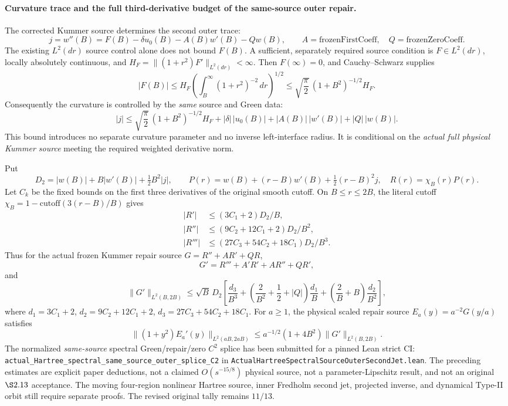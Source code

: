 \documentclass[11pt]{amsart}
\begin{document}
\paragraph{Curvature trace and the full third-derivative budget of the same-source outer repair.}
The corrected Kummer source determines the second outer trace:
\[
 j=w''(B)
 =F(B)-\delta u_0(B)
 -A(B)w'(B)-Qw(B),\qquad
 A=\mathrm{frozenFirstCoeff},\quad Q=\mathrm{frozenZeroCoeff}.
\]
The existing \(L^2(dr)\) source control alone does not bound \(F(B)\).
A sufficient, separately required source condition is
\(F\in L^2(dr)\), locally absolutely continuous, and
\(H_F=\|(1+r^2)F'\|_{L^2(dr)}<\infty\).
Then \(F(\infty)=0\), and Cauchy--Schwarz supplies
\[
 |F(B)|\le H_F\left(\int_B^\infty(1+r^2)^{-2}\,dr\right)^{1/2}
 \le \sqrt{\frac\pi2}\,(1+B^2)^{-1/2}H_F.
\]
Consequently the curvature is controlled by the \emph{same}
source and Green data:
\[
 |j|\le \sqrt{\frac\pi2}\,(1+B^2)^{-1/2}H_F
   +|\delta|\,|u_0(B)|+|A(B)|\,|w'(B)|+|Q|\,|w(B)|.
\]
This bound introduces no separate curvature parameter and no
inverse left-interface radius. It is conditional on the
\emph{actual full physical Kummer source} meeting the
required weighted derivative norm.

Put
\[
 D_2=|w(B)|+B|w'(B)|+\tfrac12B^2|j|,\qquad
 P(r)=w(B)+(r-B)w'(B)+\tfrac12(r-B)^2j,
 \quad R(r)=\chi_B(r)P(r).
\]
Let \(C_k\) be the fixed bounds on the first three
derivatives of the original smooth cutoff.
On \(B\le r\le2B\), the literal cutoff
\(\chi_B=1-\mathrm{cutoff}(3(r-B)/B)\) gives
\[
 \begin{aligned}
 |R'|&\le(3C_1+2)D_2/B,\\
 |R''|&\le(9C_2+12C_1+2)D_2/B^2,\\
 |R'''|&\le(27C_3+54C_2+18C_1)D_2/B^3.
 \end{aligned}
\]
Thus for the actual frozen Kummer repair source
\(G=R''+AR'+QR\),
\[
 G'=R'''+A'R'+AR''+QR',
\]
and
\[
 \|G'\|_{L^2(B,2B)}
 \le\sqrt B\,D_2\left[
 \frac{d_3}{B^3}
 +\left(\frac2{B^2}+\frac12+|Q|\right)\frac{d_1}{B}
 +\left(\frac2B+B\right)\frac{d_2}{B^2}
 \right],
\]
where \(d_1=3C_1+2\), \(d_2=9C_2+12C_1+2\),
\(d_3=27C_3+54C_2+18C_1\).
For \(a\ge1\), the physical scaled repair source
\(E_a(y)=a^{-2}G(y/a)\) satisfies
\[
 \|(1+y^2)E_a'(y)\|_{L^2(aB,2aB)}
 \le a^{-1/2}(1+4B^2)\|G'\|_{L^2(B,2B)}.
\]
The normalized \emph{same-source} spectral Green/repair/zero
\(C^2\) splice has been submitted for a pinned Lean strict CI:
\texttt{actual\_Hartree\_spectral\_same\_source\_outer\_splice\_C2}
in \texttt{ActualHartreeSpectralSourceOuterSecondJet.lean}.
The preceding estimates are explicit paper deductions,
not a claimed \(O(s^{-15/8})\) physical source,
not a parameter-Lipschitz result, and not an original
\(\S2.13\) acceptance. The moving four-region
nonlinear Hartree source, inner Fredholm second jet,
projected inverse, and dynamical Type-II orbit still
require separate proofs. The revised original tally
remains \(11/13\).
\end{document}
